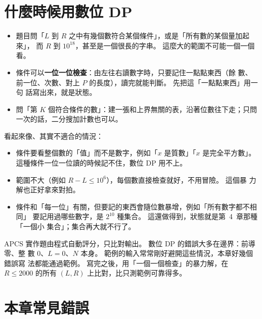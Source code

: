 \section{什麼時候用數位 DP}
\label{sec:dg-when}

\begin{itemize}
\item 題目問「$L$ 到 $R$ 之中有幾個數符合某個條件」，或是「所有數的某個量加起來」，
而 $R$ 到 $10^{18}$，甚至是一個很長的字串。 這麼大的範圍不可能一個一個看。
\item 條件可以\textbf{一位一位檢查}：由左往右讀數字時，只要記住一點點東西（餘
數、前一位、次數、對上 $P$ 的長度），讀完就能判斷。 先把這「一點點東西」用一句
話寫出來，就是狀態。
\item 問「第 $K$ 個符合條件的數」：建一張和上界無關的表，沿著位數往下走；只問
一次的話，二分搜加計數也可以。
\end{itemize}

看起來像、其實不適合的情況：

\begin{itemize}
\item 條件要看整個數的「值」而不是數字，例如「$x$ 是質數」「$x$ 是完全平方數」。
這種條件一位一位讀的時候記不住，數位 DP 用不上。
\item 範圍不大（例如 $R - L \le 10^6$），每個數直接檢查就好，不用冒險。 這個暴
力解也正好拿來對拍。
\item 條件和「每一位」有關，但要記的東西會隨位數暴增，例如「所有數字都不相同」
要記用過哪些數字，是 $2^{10}$ 種集合。 這還做得到，狀態就是第~4~章那種「一個小
集合」；集合再大就不行了。
\end{itemize}

\begin{apcsnote}
APCS 實作題由程式自動評分，只比對輸出。 數位 DP 的錯誤大多在邊界：前導零、整
數 $0$、$L = 0$、$N$ 本身。 範例的輸入常常剛好避開這些情況，本章好幾個錯誤寫
法都能通過範例。 寫完之後，用「一個一個檢查」的暴力解，在 $R \le 2000$ 的所有
$(L, R)$ 上比對，比只測範例可靠得多。
\end{apcsnote}

\section{本章常見錯誤}
\label{sec:dg-pitfalls}

